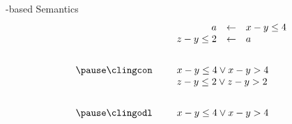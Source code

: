 \begin{frame}{\HTC-based Semantics}
  \bigskip
  \[
    \begin{array}{rp{5pt}rcl}
                     && a         &\leftarrow&  x-y\leq 4          \\
                     && z-y\leq2  &\leftarrow&  a                  \\[20pt]\pause
    \text{\clingcon} && \multicolumn{3}{l}{x-y\leq 4 \lor x-y > 4} \\
                     && \multicolumn{3}{l}{z-y\leq 2 \lor z-y>2}   \\[20pt]\pause
    \text{\clingodl} && \multicolumn{3}{l}{x-y\leq 4 \lor x-y > 4}
    \end{array}
  \]
\end{frame}
%
